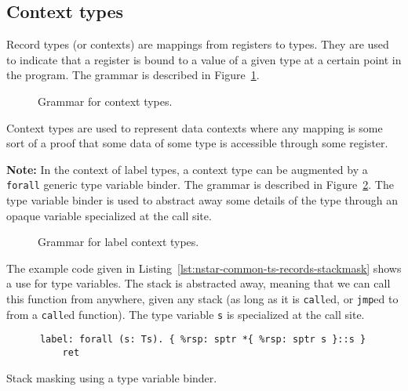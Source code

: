 \subsection{Context types}\label{subsec:nstar-common-ts-records}

Record types (or contexts) are mappings from registers to types.
They are used to indicate that a register is bound to a value of a given type at a certain point in the program.
The grammar is described in Figure~\ref{fig:nstar-common-ts-records-syntax}.

\begin{figure}[htb]
  \centering
  \caption{Grammar for context types.}
  \label{fig:nstar-common-ts-records-syntax}
\end{figure}

Context types are used to represent data contexts where any mapping is some sort of a proof that some data of some type is accessible through some register.

\vspace{\baselineskip}

\textbf{Note:} In the context of label types, a context type can be augmented by a \texttt{forall} generic type variable binder.
The grammar is described in Figure~\ref{fig:nstar-common-ts-label-types-syntax}.
The type variable binder is used to abstract away some details of the type through an opaque variable specialized at the call site.

\begin{figure}[htb]
  \centering
  \caption{Grammar for label context types.}
  \label{fig:nstar-common-ts-label-types-syntax}
\end{figure}

The example code given in Listing~\ref{lst:nstar-common-ts-records-stackmask} shows a use for type variables.
The stack is abstracted away, meaning that we can call this function from anywhere, given any stack (as long as it is \texttt{call}ed, or \texttt{jmp}ed to from a \texttt{call}ed function).
The type variable \texttt{s} is specialized at the call site.

\begin{listing}[htb]
  \centering
  \begin{minipage}{0.90\textwidth}
    \begin{verbatim}
      label: forall (s: Ts). { %rsp: sptr *{ %rsp: sptr s }::s }
          ret
    \end{verbatim}
  \end{minipage}
  \caption{Stack masking using a type variable binder.}
  \label{lst:nstar-common-ts-records-stackmask}
\end{listing}

